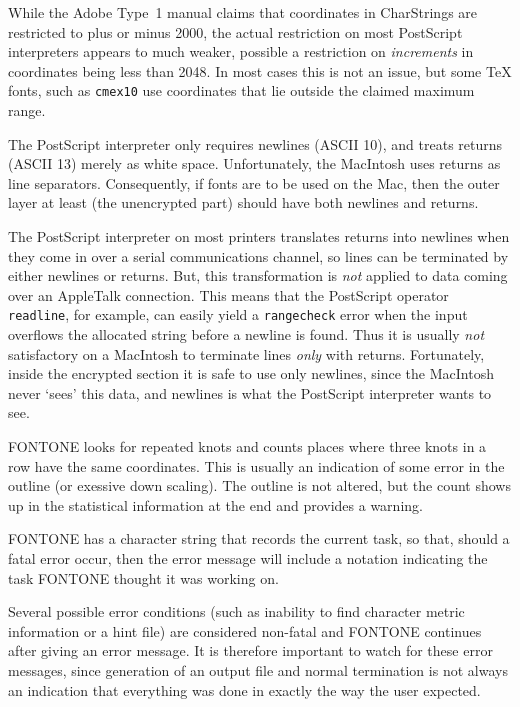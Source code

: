 \bpar While the Adobe Type~1 manual claims that coordinates in
CharStrings are restricted to plus or minus 2000, the actual
restriction on most PostScript interpreters appears to much weaker,
possible a restriction on {\it increments} in coordinates being less
than 2048. 
In most cases this is not an issue, but some {\TeX} fonts, such as 
{\tt cmex10} use coordinates that lie outside the claimed maximum range.

\bpar The PostScript interpreter only requires newlines (ASCII 10), and
treats returns (ASCII 13) merely as white space.
Unfortunately, the MacIntosh uses returns as line separators.
Consequently, if fonts are to be used on the Mac, then the outer layer
at least (the unencrypted part) should have both newlines and returns.

\bpar The PostScript interpreter on most printers translates returns
into newlines when they come in over a serial communications channel,
so lines can be terminated by either newlines or returns.  
But, this transformation is {\it not} applied to data coming over an
AppleTalk connection.
This means that the PostScript operator {\tt readline}, for example,
can easily yield a {\tt rangecheck} error when the input overflows the
allocated string before a newline is found.  
Thus it is usually {\it not} satisfactory on a MacIntosh to terminate lines
{\it only} with returns.
Fortunately, inside the encrypted section it is safe to use only
newlines, since the MacIntosh never `sees' this data, and newlines is
what the PostScript interpreter wants to see.


\bpar FONTONE looks for repeated knots and counts places where three
knots in a row have the same coordinates.  This is usually an
indication of some error in the outline (or exessive down scaling).
The outline is not altered, but the count shows up in the statistical
information at the end and provides a warning.

\bpar FONTONE has a character string that records the current task, 
so that, should a fatal error occur, then the error message will
include a notation indicating the task FONTONE thought it was working on.

\bpar Several possible error conditions (such as inability to find
character metric information or a hint file) are considered non-fatal
and FONTONE continues after giving an error message.  It is therefore
important to watch for these error messages, since generation of an
output file and normal termination is not always an indication that
everything was done in exactly the way the user expected.

